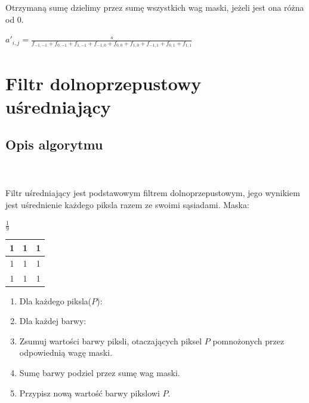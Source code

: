 \documentclass[final,a4paper,openany,12pt]{mwbk}
\begin{document}
Otrzymaną sumę dzielimy przez sumę wszystkich wag maski, jeżeli jest ona różna od 0.

\begin{center}
	$a'_{i,j} = \frac{s}{f_{-1,-1} + f_{0,-1} + f_{1,-1} + f_{-1,0} + f_{0,0} + f_{1,0} + f_{-1,1} + f_{0,1} + f_{1,1}}$
\end{center}

\newpage


\section{Filtr dolnoprzepustowy uśredniający}
\subsection*{Opis algorytmu}
\hfill
\\\\
\indent Filtr uśredniający jest podstawowym filtrem dolnoprzepustowym, jego wynikiem jest uśrednienie każdego piksla razem ze swoimi sąsiadami. Maska:
\begin{center}
	$\frac{1}{9}$ 
	\begin{tabular}{|c|c|c|}
		\hline
		1 & 1 & 1\\
		\hline
		1 & 1 & 1\\
		\hline
		1 & 1 & 1\\
		\hline
	\end{tabular}
\end{center}

\begin{enumerate}
	\item Dla każdego piksla($P$):
	\item Dla każdej barwy:
	\item Zsumuj wartości barwy piksli, otaczających piksel $P$ pomnożonych przez odpowiednią wagę maski.
	\item Sumę barwy podziel przez sumę wag maski.
	\item Przypisz nową wartość barwy pikslowi $P$.
\end{enumerate}
\end{document}
